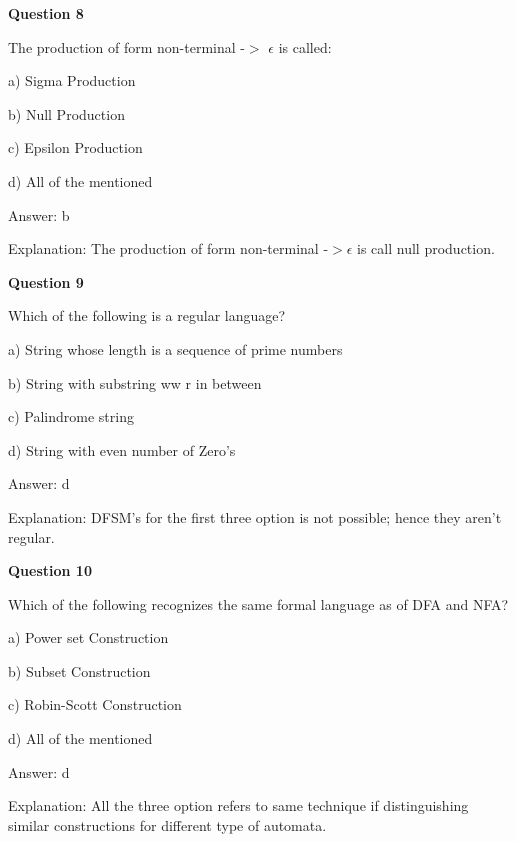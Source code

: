 \documentclass{article}
\begin{document}
\begin{mdframed}[linewidth=1pt, roundcorner=5pt, linecolor=gray!30, backgroundcolor=gray!5]
\textbf{Question 8} 

The production of form non-terminal -$>$ $\epsilon$ is called:

a) Sigma Production

b) Null Production

c) Epsilon Production

d) All of the mentioned
\vspace{5pt} \par
\begin{tcolorbox}[colback=green!5, colframe=green!40!black, title=Solution]
Answer: b

Explanation: The production of form non-terminal -$>$$\epsilon$ is call null production.
\end{tcolorbox}
\end{mdframed}
\newpage

\begin{mdframed}[linewidth=1pt, roundcorner=5pt, linecolor=gray!30, backgroundcolor=gray!5]
\textbf{Question 9} 

Which of the following is a regular language?

a) String whose length is a sequence of prime numbers

b) String with substring ww
r
 in between

c) Palindrome string

d) String with even number of Zero's
\vspace{5pt} \par
\begin{tcolorbox}[colback=green!5, colframe=green!40!black, title=Solution]
Answer: d

Explanation: DFSM's for the first three option is not possible; hence they aren't regular.
\end{tcolorbox}
\end{mdframed}

\begin{mdframed}[linewidth=1pt, roundcorner=5pt, linecolor=gray!30, backgroundcolor=gray!5]
\textbf{Question 10} 

Which of the following recognizes the same formal language as of DFA and NFA?

a) Power set Construction

b) Subset Construction

c) Robin-Scott Construction

d) All of the mentioned
\vspace{5pt} \par
\begin{tcolorbox}[colback=green!5, colframe=green!40!black, title=Solution]
Answer: d

Explanation: All the three option refers to same technique if distinguishing similar constructions for different type of automata.
\end{tcolorbox}
\end{mdframed}
\newpage
\end{document}
